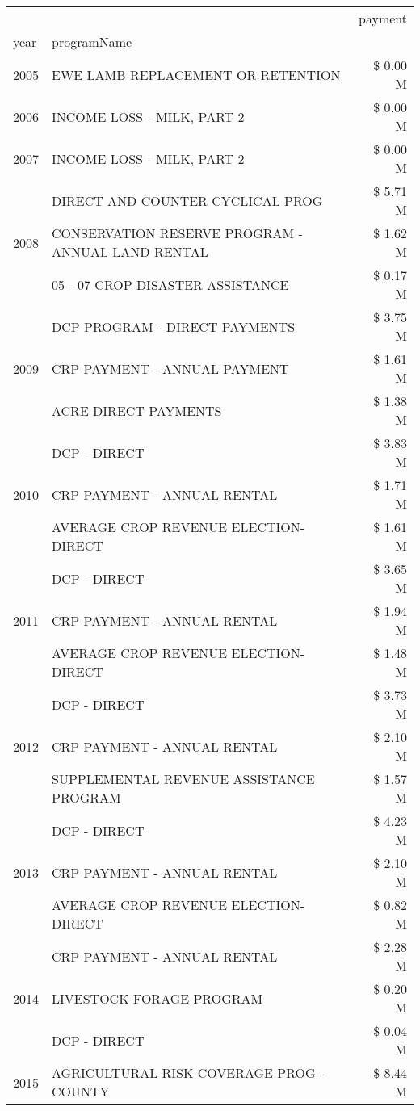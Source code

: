 \begin{tabular}{llr}
\toprule
 &  & payment \\
year & programName &  \\
\midrule
2005 & EWE LAMB REPLACEMENT OR RETENTION & \$ 0.00 M \\
\cline{1-3}
2006 & INCOME LOSS - MILK, PART 2 & \$ 0.00 M \\
\cline{1-3}
2007 & INCOME LOSS - MILK, PART 2 & \$ 0.00 M \\
\cline{1-3}
\multirow[t]{3}{*}{2008} & DIRECT AND COUNTER CYCLICAL PROG & \$ 5.71 M \\
 & CONSERVATION RESERVE PROGRAM - ANNUAL LAND RENTAL & \$ 1.62 M \\
 & 05 - 07 CROP DISASTER ASSISTANCE & \$ 0.17 M \\
\cline{1-3}
\multirow[t]{3}{*}{2009} & DCP PROGRAM - DIRECT PAYMENTS & \$ 3.75 M \\
 & CRP PAYMENT - ANNUAL PAYMENT & \$ 1.61 M \\
 & ACRE DIRECT PAYMENTS & \$ 1.38 M \\
\cline{1-3}
\multirow[t]{3}{*}{2010} & DCP - DIRECT & \$ 3.83 M \\
 & CRP PAYMENT - ANNUAL RENTAL & \$ 1.71 M \\
 & AVERAGE CROP REVENUE ELECTION-DIRECT & \$ 1.61 M \\
\cline{1-3}
\multirow[t]{3}{*}{2011} & DCP - DIRECT & \$ 3.65 M \\
 & CRP PAYMENT - ANNUAL RENTAL & \$ 1.94 M \\
 & AVERAGE CROP REVENUE ELECTION-DIRECT & \$ 1.48 M \\
\cline{1-3}
\multirow[t]{3}{*}{2012} & DCP - DIRECT & \$ 3.73 M \\
 & CRP PAYMENT - ANNUAL RENTAL & \$ 2.10 M \\
 & SUPPLEMENTAL REVENUE ASSISTANCE PROGRAM & \$ 1.57 M \\
\cline{1-3}
\multirow[t]{3}{*}{2013} & DCP - DIRECT & \$ 4.23 M \\
 & CRP PAYMENT - ANNUAL RENTAL & \$ 2.10 M \\
 & AVERAGE CROP REVENUE ELECTION-DIRECT & \$ 0.82 M \\
\cline{1-3}
\multirow[t]{3}{*}{2014} & CRP PAYMENT - ANNUAL RENTAL & \$ 2.28 M \\
 & LIVESTOCK FORAGE PROGRAM & \$ 0.20 M \\
 & DCP - DIRECT & \$ 0.04 M \\
\cline{1-3}
\multirow[t]{3}{*}{2015} & AGRICULTURAL RISK COVERAGE PROG - COUNTY & \$ 8.44 M \\

\end{tabular}
